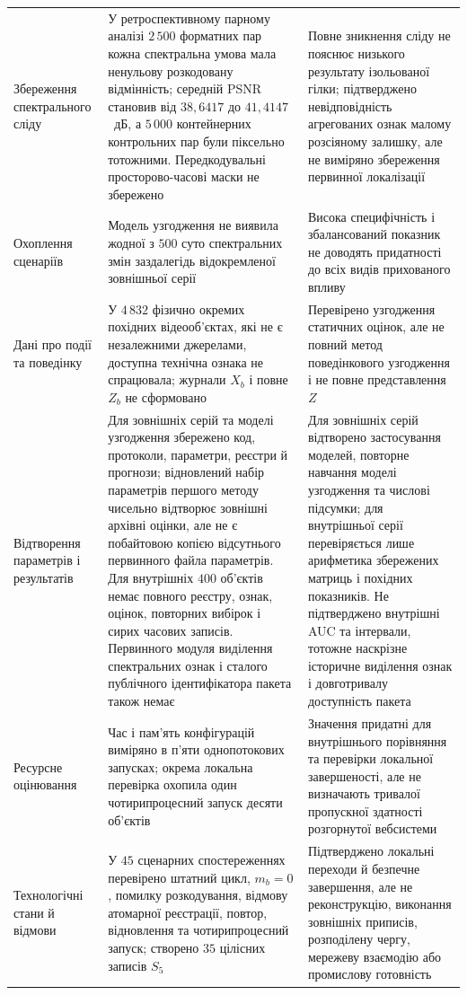 {\begin{longtable}{@{}p{}p{}p{}@{}}
Збереження спектрального сліду & У ретроспективному парному аналізі $2\,500$ форматних пар кожна спектральна умова мала ненульову розкодовану відмінність; середній PSNR становив від $38{,}6417$ до $41{,}4147$~дБ, а $5\,000$ контейнерних контрольних пар були піксельно тотожними. Передкодувальні просторово-часові маски не збережено & Повне зникнення сліду не пояснює низького результату ізольованої гілки; підтверджено невідповідність агрегованих ознак малому розсіяному залишку, але не виміряно збереження первинної локалізації \\
Охоплення сценаріїв & Модель узгодження не виявила жодної з $500$ суто спектральних змін заздалегідь відокремленої зовнішньої серії & Висока специфічність і збалансований показник не доводять придатності до всіх видів прихованого впливу \\
Дані про події та поведінку & У $4\,832$ фізично окремих похідних відеооб’єктах, які не є незалежними джерелами, доступна технічна ознака не спрацювала; журнали $X_b$ і повне $Z_b$ не сформовано & Перевірено узгодження статичних оцінок, але не повний метод поведінкового узгодження і не повне представлення $Z$ \\
Відтворення параметрів і результатів & Для зовнішніх серій та моделі узгодження збережено код, протоколи, параметри, реєстри й прогнози; відновлений набір параметрів першого методу чисельно відтворює зовнішні архівні оцінки, але не є побайтовою копією відсутнього первинного файла параметрів. Для внутрішніх $400$ об’єктів немає повного реєстру, ознак, оцінок, повторних вибірок і сирих часових записів. Первинного модуля виділення спектральних ознак і сталого публічного ідентифікатора пакета також немає & Для зовнішніх серій відтворено застосування моделей, повторне навчання моделі узгодження та числові підсумки; для внутрішньої серії перевіряється лише арифметика збережених матриць і похідних показників. Не підтверджено внутрішні AUC та інтервали, тотожне наскрізне історичне виділення ознак і довготривалу доступність пакета \\
Ресурсне оцінювання & Час і пам’ять конфігурацій виміряно в п’яти однопотокових запусках; окрема локальна перевірка охопила один чотирипроцесний запуск десяти об’єктів & Значення придатні для внутрішнього порівняння та перевірки локальної завершеності, але не визначають тривалої пропускної здатності розгорнутої вебсистеми \\
Технологічні стани й відмови & У $45$ сценарних спостереженнях перевірено штатний цикл, $m_b=0$, помилку розкодування, відмову атомарної реєстрації, повтор, відновлення та чотирипроцесний запуск; створено $35$ цілісних записів $S_5$ & Підтверджено локальні переходи й безпечне завершення, але не реконструкцію, виконання зовнішніх приписів, розподілену чергу, мережеву взаємодію або промислову готовність \\

\end{longtable}}
